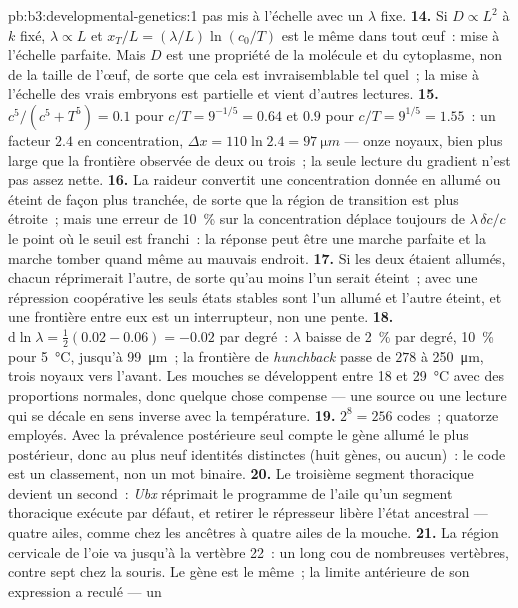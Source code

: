 \begin{solution}{pb:b3:developmental-genetics:1}
pas mis à l'échelle avec un $\lambda$ fixe.
\textbf{14.} Si $D \propto L^{2}$ à $k$ fixé, $\lambda \propto L$ et
$x_{T}/L = (\lambda/L)\ln(c_{0}/T)$ est le même dans tout œuf~: mise à
l'échelle parfaite. Mais $D$ est une propriété de la molécule et du
cytoplasme, non de la taille de l'œuf, de sorte que cela est
invraisemblable tel quel~; la mise à l'échelle des vrais embryons est
partielle et vient d'autres lectures.
\textbf{15.} $c^{5}/(c^{5} + T^{5}) = 0.1$ pour $c/T = 9^{-1/5} = 0.64$ et
$0.9$ pour $c/T = 9^{1/5} = 1.55$~: un facteur $2.4$ en concentration,
$\Delta x = 110\ln 2.4 = \qty{97}{\micro m}$ --- onze noyaux, bien plus
large que la frontière observée de deux ou trois~; la seule lecture du
gradient n'est pas assez nette.
\textbf{16.} La raideur convertit une concentration donnée en allumé ou
éteint de façon plus tranchée, de sorte que la région de transition est
plus étroite~; mais une erreur de \qty{10}{\%} sur la concentration
déplace toujours de $\lambda\,\delta c/c$ le point où le seuil est
franchi~: la réponse peut être une marche parfaite et la marche tomber
quand même au mauvais endroit.
\textbf{17.} Si les deux étaient allumés, chacun réprimerait l'autre, de
sorte qu'au moins l'un serait éteint~; avec une répression coopérative
les seuls états stables sont l'un allumé et l'autre éteint, et une
frontière entre eux est un interrupteur, non une pente.
\textbf{18.} $\mathrm{d}\ln\lambda = \tfrac{1}{2}(0.02 - 0.06) = -0.02$
par degré~: $\lambda$ baisse de \qty{2}{\%} par degré, \qty{10}{\%} pour
\qty{5}{\celsius}, jusqu'à \qty{99}{\micro m}~; la frontière de
\emph{hunchback} passe de $278$ à \qty{250}{\micro m}, trois noyaux vers
l'avant. Les mouches se développent entre \qty{18}{} et
\qty{29}{\celsius} avec des proportions normales, donc quelque chose
compense --- une source ou une lecture qui se décale en sens inverse
avec la température.
\textbf{19.} $2^{8} = 256$ codes~; quatorze employés. Avec la prévalence
postérieure seul compte le gène allumé le plus postérieur, donc au plus
neuf identités distinctes (huit gènes, ou aucun)~: le code est un
classement, non un mot binaire.
\textbf{20.} Le troisième segment thoracique devient un second~:
\emph{Ubx} réprimait le programme de l'aile qu'un segment thoracique
exécute par défaut, et retirer le répresseur libère l'état ancestral ---
quatre ailes, comme chez les ancêtres à quatre ailes de la mouche.
\textbf{21.} La région cervicale de l'oie va jusqu'à la vertèbre 22~: un
long cou de nombreuses vertèbres, contre sept chez la souris. Le gène
est le même~; la limite antérieure de son expression a reculé --- un

\end{solution}
